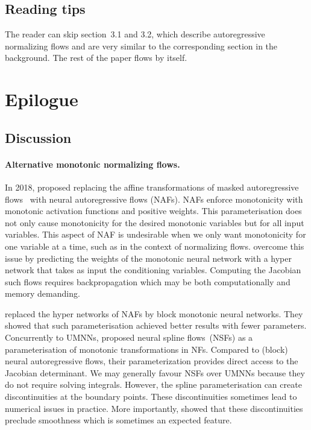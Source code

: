 \subsection{Reading tips}
The reader can skip section~3.1 and 3.2, which describe autoregressive normalizing flows and are very similar to the corresponding section in the background. The rest of the paper flows by itself.



\section{Epilogue} \label{epi:ch05}
\subsection{Discussion}
\paragraph{Alternative monotonic normalizing flows.}
In 2018, \citet{huang_neural_2018} proposed replacing the affine transformations of masked autoregressive flows~\citep{papamakarios_masked_2017} with neural autoregressive flows (NAFs). NAFs enforce monotonicity with monotonic activation functions and positive weights. This parameterisation does not only cause monotonicity for the desired monotonic variables but for all input variables. This aspect of NAF is undesirable when we only want monotonicity for one variable at a time, such as in the context of normalizing flows. \citet{huang_neural_2018} overcome this issue by predicting the weights of the monotonic neural network with a hyper network that takes as input the conditioning variables. Computing the Jacobian such flows requires backpropagation which may be both computationally and memory demanding.

\citet{de_cao_block_2020} replaced the hyper networks of NAFs by block monotonic neural networks. They showed that such parameterisation achieved better results with fewer parameters. Concurrently to UMNNs, \citet{durkan_neural_2019} proposed neural spline flows~(NSFs) as a parameterisation of monotonic transformations in NFs. Compared to (block) neural autoregressive flows, their parameterization provides direct access to the Jacobian determinant. We may generally favour NSFs over UMNNs because they do not require solving integrals. However, the spline parameterisation can create discontinuities at the boundary points. These discontinuities sometimes lead to numerical issues in practice. More importantly, \citet{kohler2021smooth} showed that these discontinuities preclude smoothness which is sometimes an expected feature.

